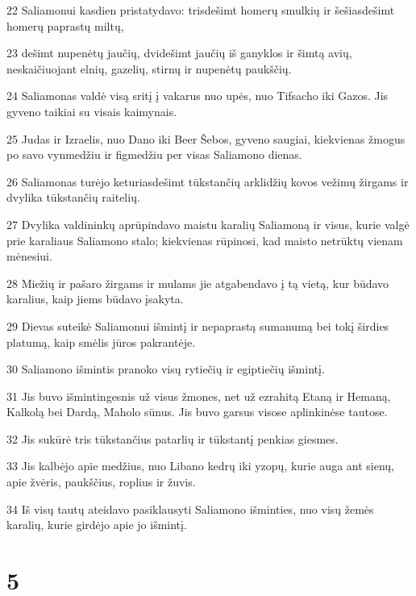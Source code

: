 \par 22 Saliamonui kasdien pristatydavo: trisdešimt homerų smulkių ir šešiasdešimt homerų paprastų miltų, 
\par 23 dešimt nupenėtų jaučių, dvidešimt jaučių iš ganyklos ir šimtą avių, neskaičiuojant elnių, gazelių, stirnų ir nupenėtų paukščių. 
\par 24 Saliamonas valdė visą sritį į vakarus nuo upės, nuo Tifsacho iki Gazos. Jis gyveno taikiai su visais kaimynais. 
\par 25 Judas ir Izraelis, nuo Dano iki Beer Šebos, gyveno saugiai, kiekvienas žmogus po savo vynmedžiu ir figmedžiu per visas Saliamono dienas. 
\par 26 Saliamonas turėjo keturiasdešimt tūkstančių arklidžių kovos vežimų žirgams ir dvylika tūkstančių raitelių. 
\par 27 Dvylika valdininkų aprūpindavo maistu karalių Saliamoną ir visus, kurie valgė prie karaliaus Saliamono stalo; kiekvienas rūpinosi, kad maisto netrūktų vienam mėnesiui. 
\par 28 Miežių ir pašaro žirgams ir mulams jie atgabendavo į tą vietą, kur būdavo karalius, kaip jiems būdavo įsakyta. 
\par 29 Dievas suteikė Saliamonui išmintį ir nepaprastą sumanumą bei tokį širdies platumą, kaip smėlis jūros pakrantėje. 
\par 30 Saliamono išmintis pranoko visų rytiečių ir egiptiečių išmintį. 
\par 31 Jis buvo išmintingesnis už visus žmones, net už ezrahitą Etaną ir Hemaną, Kalkolą bei Dardą, Maholo sūnus. Jis buvo garsus visose aplinkinėse tautose. 
\par 32 Jis sukūrė tris tūkstančius patarlių ir tūkstantį penkias giesmes. 
\par 33 Jis kalbėjo apie medžius, nuo Libano kedrų iki yzopų, kurie auga ant sienų, apie žvėris, paukščius, roplius ir žuvis. 
\par 34 Iš visų tautų ateidavo pasiklausyti Saliamono išminties, nuo visų žemės karalių, kurie girdėjo apie jo išmintį.



\chapter{5}

